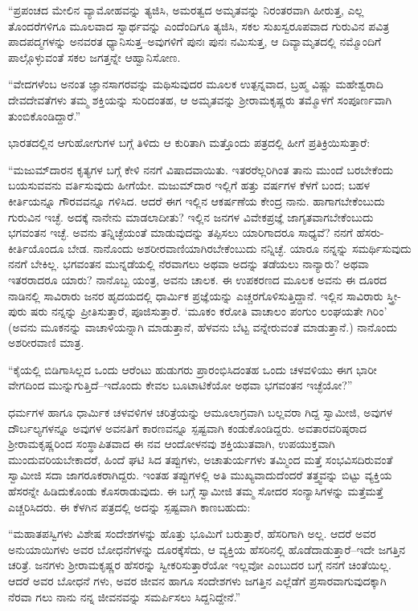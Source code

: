 “ಪ್ರಪಂಚದ ಮೇಲಿನ ವ್ಯಾಮೋಹವನ್ನು ತ್ಯಜಿಸಿ, ಅಮರತ್ವದ ಅಮೃತವನ್ನು ನಿರಂತರವಾಗಿ ಹೀರುತ್ತ, ಎಲ್ಲ ತೊಂದರೆಗಳಿಗೂ ಮೂಲವಾದ ಸ್ವಾರ್ಥವನ್ನು ಎಂದೆಂದಿಗೂ ತ್ಯಜಿಸಿ, ಸಕಲ ಸುಖಸ್ವರೂಪವಾದ ಗುರುವಿನ ಪವಿತ್ರ ಪಾದಪದ್ಮಗಳನ್ನು ಅನವರತ ಧ್ಯಾನಿಸುತ್ತ–ಅವುಗಳಿಗೆ ಪುನಃ ಪುನಃ ನಮಿಸುತ್ತ, ಆ ದಿವ್ಯಾಮೃತದಲ್ಲಿ ನಮ್ಮೊಂದಿಗೆ ಪಾಲ್ಗೊಳ್ಳುವಂತೆ ಸಕಲ ಜಗತ್ತನ್ನೇ ಆಹ್ವಾನಿಸೋಣ.

“ವೇದಗಳೆಂಬ ಅನಂತ ಜ್ಞಾನಸಾಗರವನ್ನು ಮಥಿಸುವುದರ ಮೂಲಕ ಉತ್ಪನ್ನವಾದ, ಬ್ರಹ್ಮ ವಿಷ್ಣು ಮಹೇಶ್ವರಾದಿ ದೇವದೇವತೆಗಳು ತಮ್ಮ ಶಕ್ತಿಯನ್ನು ಸುರಿದಂತಹ, ಆ ಅಮೃತವನ್ನು ಶ್ರೀರಾಮಕೃಷ್ಣರು ತಮ್ಮೊಳಗೆ ಸಂಪೂರ್ಣವಾಗಿ ತುಂಬಿಕೊಂಡಿದ್ದಾರೆ.”

ಭಾರತದಲ್ಲಿನ ಆಗುಹೋಗುಗಳ ಬಗ್ಗೆ ತಿಳಿದು ಆ ಕುರಿತಾಗಿ ಮತ್ತೊಂದು ಪತ್ರದಲ್ಲಿ ಹೀಗೆ ಪ್ರತಿಕ್ರಿಯಿಸುತ್ತಾರೆ:

“ಮಜುಮ್​ದಾರನ ಕೃತ್ಯಗಳ ಬಗ್ಗೆ ಕೇಳಿ ನನಗೆ ವಿಷಾದವಾಯಿತು. ಇತರರೆಲ್ಲರಿಗಿಂತ ತಾನು ಮುಂದೆ ಬರಬೇಕೆಂದು ಬಯಸುವವನು ವರ್ತಿಸುವುದು ಹೀಗೆಯೇ. ಮಜುಮ್​ದಾರ ಇಲ್ಲಿಗೆ ಹತ್ತು ವರ್ಷಗಳ ಕೆಳಗೆ ಬಂದ; ಬಹಳ ಕೀರ್ತಿಯನ್ನೂ ಗೌರವವನ್ನೂ ಗಳಿಸಿದ. ಆದರೆ ಈಗ ಇಲ್ಲಿನ ಆಕರ್ಷಣೆಯ ಕೇಂದ್ರ ನಾನು. ಹಾಗಾಗಬೇಕೆಂಬುದು ಗುರುವಿನ ಇಚ್ಛೆ. ಅದಕ್ಕೆ ನಾನೇನು ಮಾಡಲಾದೀತು? ಇಲ್ಲಿನ ಜನಗಳ ವಿವೇಕಪ್ರಜ್ಞೆ ಜಾಗೃತವಾಗಬೇಕೆಂಬುದು ಭಗವಂತನ ಇಚ್ಛೆ. ಅವನು ತನ್ನಿಚ್ಛೆಯಂತೆ ಮಾಡುವುದನ್ನು ತಪ್ಪಿಸಲು ಯಾರಿಗಾದರೂ ಸಾಧ್ಯವೆ? ನನಗೆ ಹೆಸರು-ಕೀರ್ತಿಯೊಂದೂ ಬೇಡ. ನಾನೊಂದು ಅಶರೀರವಾಣಿಯಾಗಿರಬೇಕೆಂಬುದು ನನ್ನಿಚ್ಛೆ. ಯಾರೂ ನನ್ನನ್ನು ಸಮರ್ಥಿಸುವುದು ನನಗೆ ಬೇಕಿಲ್ಲ. ಭಗವಂತನ ಮುನ್ನಡೆಯಲ್ಲಿ ನೆರವಾಗಲು ಅಥವಾ ಅದನ್ನು ತಡೆಯಲು ನಾನ್ಯಾರು? ಅಥವಾ ಇತರರಾದರೂ ಯಾರು? ನಾನೊಬ್ಬ ಯಂತ್ರ, ಅವನು ಚಾಲಕ. ಈ ಉಪಕರಣದ ಮೂಲಕ ಅವನು ಈ ದೂರದ ನಾಡಿನಲ್ಲಿ ಸಾವಿರಾರು ಜನರ ಹೃದಯದಲ್ಲಿ ಧಾರ್ಮಿಕ ಪ್ರಜ್ಞೆಯನ್ನು ಎಚ್ಚರಗೊಳಿಸುತ್ತಿದ್ದಾನೆ. ಇಲ್ಲಿನ ಸಾವಿರಾರು ಸ್ತ್ರೀ-ಪುರು ಷರು ನನ್ನನ್ನು ಪ್ರೀತಿಸುತ್ತಾರೆ, ಪೂಜಿಸುತ್ತಾರೆ. ‘ಮೂಕಂ ಕರೋತಿ ವಾಚಾಲಂ ಪಂಗುಂ ಲಂಘಯತೇ ಗಿರಿಂ’ (ಅವನು ಮೂಕನನ್ನು ವಾಚಾಳಿಯನ್ನಾಗಿ ಮಾಡುತ್ತಾನೆ, ಹೆಳವನು ಬೆಟ್ಟ ವನ್ನೇರುವಂತೆ ಮಾಡುತ್ತಾನೆ.) ನಾನೊಂದು ಅಶರೀರವಾಣಿ ಮಾತ್ರ.

“ಕೈಯಲ್ಲಿ ಬಿಡಿಗಾಸಿಲ್ಲದ ಒಂದು ಆರೆಂಟು ಹುಡುಗರು ಪ್ರಾರಂಭಿಸಿದಂತಹ ಒಂದು ಚಳವಳಿಯು ಈಗ ಭಾರೀ ವೇಗದಿಂದ ಮುನ್ನುಗುತ್ತಿದೆ–ಇದೊಂದು ಕೇವಲ ಬೂಟಾಟಿಕೆಯೋ ಅಥವಾ ಭಗವಂತನ ಇಚ್ಛೆಯೋ?”

ಧರ್ಮಗಳ ಹಾಗೂ ಧಾರ್ಮಿಕ ಚಳವಳಿಗಳ ಚರಿತ್ರೆಯನ್ನು ಆಮೂಲಾಗ್ರವಾಗಿ ಬಲ್ಲವರಾ ಗಿದ್ದ ಸ್ವಾಮೀಜಿ, ಅವುಗಳ ದೌರ್ಬಲ್ಯಗಳನ್ನೂ ಅವುಗಳ ಅವನತಿಗೆ ಕಾರಣವನ್ನೂ ಸ್ಪಷ್ಟವಾಗಿ ಕಂಡುಕೊಂಡಿದ್ದರು. ಅವತಾರವರಿಷ್ಠರಾದ ಶ್ರೀರಾಮಕೃಷ್ಣರಿಂದ ಸಂಸ್ಥಾಪಿತವಾದ ಈ ನವ ಆಂದೋಳನವು ಶಕ್ತಿಯುತವಾಗಿ, ಉಪಯುಕ್ತವಾಗಿ ಮುಂದುವರಿಯಬೇಕಾದರೆ, ಹಿಂದೆ ಘಟಿ ಸಿದ ತಪ್ಪುಗಳು, ಅಚಾತುರ್ಯಗಳು ತಮ್ಮಿಂದ ಮತ್ತೆ ಸಂಭವಿಸದಿರುವಂತೆ ಸ್ವಾಮೀಜಿ ಸದಾ ಜಾಗರೂಕರಾಗಿದ್ದರು. ಇಂತಹ ತಪ್ಪುಗಳಲ್ಲಿ ಅತಿ ಮುಖ್ಯವಾದುದೆಂದರೆ ತತ್ತ್ವವನ್ನು ಬಿಟ್ಟು ವ್ಯಕ್ತಿಯ ಹೆಸರನ್ನೇ ಹಿಡಿದುಕೊಂಡು ಕೊಸರಾಡುವುದು. ಈ ಬಗ್ಗೆ ಸ್ವಾಮೀಜಿ ತಮ್ಮ ಸೋದರ ಸಂನ್ಯಾಸಿಗಳನ್ನು ಮತ್ತೆಮತ್ತೆ ಎಚ್ಚರಿಸಿದರು. ಈ ಕೆಳಗಿನ ಪತ್ರದಲ್ಲಿ ಅದನ್ನು ಸ್ಪಷ್ಟವಾಗಿ ಕಾಣಬಹುದು:

“ಮಹಾತಪಸ್ವಿಗಳು ವಿಶೇಷ ಸಂದೇಶಗಳನ್ನು ಹೊತ್ತು ಭೂಮಿಗೆ ಬರುತ್ತಾರೆ, ಹೆಸರಿಗಾಗಿ ಅಲ್ಲ. ಆದರೆ ಅವರ ಅನುಯಾಯಿಗಳು ಅವರ ಬೋಧನೆಗಳನ್ನು ದೂರಕ್ಕೆಸೆದು, ಆ ವ್ಯಕ್ತಿಯ ಹೆಸರಿನಲ್ಲಿ ಹೊಡೆದಾಡುತ್ತಾರೆ–ಇದೇ ಜಗತ್ತಿನ ಚರಿತ್ರೆ. ಜನಗಳು ಶ್ರೀರಾಮಕೃಷ್ಣರ ಹೆಸರನ್ನು ಸ್ವೀಕರಿಸುತ್ತಾರೆಯೋ ಇಲ್ಲವೋ ಎಂಬುದರ ಬಗ್ಗೆ ನನಗೆ ಚಿಂತೆಯಿಲ್ಲ. ಆದರೆ ಅವರ ಬೋಧನೆ ಗಳು, ಅವರ ಜೀವನ ಹಾಗೂ ಸಂದೇಶಗಳು ಜಗತ್ತಿನ ಎಲ್ಲೆಡೆಗೆ ಪ್ರಸಾರವಾಗುವುದಕ್ಕಾಗಿ ನೆರವಾ ಗಲು ನಾನು ನನ್ನ ಜೀವನವನ್ನು ಸಮರ್ಪಿಸಲು ಸಿದ್ದನಿದ್ದೇನೆ.”

